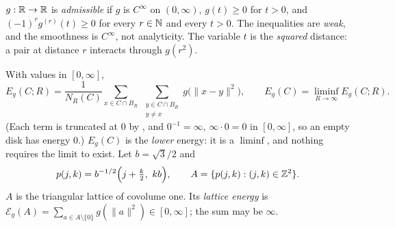 \begin{definition}\label{ch2:def:adm}
$g:\mathbb{R}\to\mathbb{R}$ is \emph{admissible} if $g$ is $C^\infty$ on $(0,\infty)$, $g(t)\ge 0$ for $t>0$, and
$(-1)^r g^{(r)}(t)\ge 0$ for every $r\in\mathbb{N}$ and every $t>0$. The inequalities are \emph{weak}, and the smoothness is
$C^\infty$, not analyticity. The variable $t$ is the \emph{squared} distance: a pair at distance $r$ interacts through
$g(r^2)$.
\end{definition}

\begin{definition}\label{ch2:def:energy}
With values in $[0,\infty]$,
\[
E_g(C;R)=\frac{1}{N_R(C)}\sum_{x\in C\cap B_R}\ \sum_{\substack{y\in C\cap B_R\\ y\neq x}} g\bigl(\|x-y\|^2\bigr),
\qquad
E_g(C)=\liminf_{R\to\infty}E_g(C;R).
\]
(Each term is truncated at $0$ by , and $0^{-1}=\infty$, $\infty\cdot 0=0$ in $[0,\infty]$, so an
empty disk has energy $0$.) $E_g(C)$ is the \emph{lower} energy: it is a $\liminf$, and nothing requires the limit to
exist. Let $b=\sqrt3/2$ and
\[
p(j,k)=b^{-1/2}\Bigl(j+\tfrac k2,\ kb\Bigr),\qquad A=\{p(j,k):(j,k)\in\Z^2\}.
\]
$A$ is the triangular lattice of covolume one. Its \emph{lattice energy} is $\mathcal{E}_g(A)=\sum_{a\in A\setminus\{0\}}
g(\|a\|^2)\in[0,\infty]$; the sum may be $\infty$.
\end{definition}

